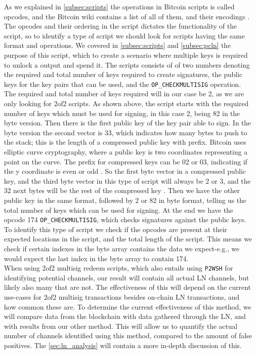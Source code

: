 As we explained in \cref{subsec:scripts} the operations in Bitcoin scripts is called opcodes, and the Bitcoin wiki contains a list of all of them, and their encodings \cite{bitcoin_wiki_scripts}. The opcodes and their ordering in the script dictates the functionality of the script, so to identify a type of script we should look for scripts having the same format and operations.
We covered in \cref{subsec:scripts} and \cref{subsec:pcln} the purpose of this script, which to create a scenario where multiple keys is required to unlock a output and spend it.
The scripts consists of of two numbers denoting the required and total number of keys required to create signatures, the public keys for the key pairs that can be used, and the {\tt OP\_CHECKMULTISIG} operation. The required and total number of keys required will in our case be 2, as we are only looking for 2of2 scripts.
As shown above, the script starts with the required number of keys which must be used for signing, in this case 2, being 82 in the byte version. Then there is the first public key of the key pair able to sign. 
In the byte version the second vector is 33, which indicates how many bytes to push to the stack; this is the length of a compressed public key with prefix. Bitcoin uses elliptic curve cryptography, where a public key is two coordinates representing a point on the curve. The prefix for compressed keys can be 02 or 03, indicating if the y coordinate is even or odd \cite{antonopoulos2017mastering}. So the first byte vector in a compressed public key, and the third byte vector in this type of script will always be 2 or 3, and the 32 next bytes will be the rest of the compressed key {\tt <public key 1>}. Then we have the other public key {\tt <public key 2>} in the same format, followed by 2 or 82 in byte format, telling us the total number of keys which can be used for signing. At the end we have the opcode 174 {\tt OP\_CHECKMULTISIG}, which checks signatures against the public keys. To identify this type of script we check if the opcodes are present at their expected locations in the script, and the total length of the script. This means we check if certain indexes in the byte array contains the data we expect-e.g., we would expect the last index in the byte array to contain 174.
\\

When using 2of2 multisig redeem scripts, which also entails using {\tt P2WSH} for identifying potential channels, our result will contain all actual LN channels, but likely also many that are not. The effectiveness of this will depend on the current use-cases for 2of2 multisig transactions besides on-chain LN transactions, and how common these are. To determine the current effectiveness of this method, we will compare data from the blockchain with data gathered through the LN, and with results from our other method. This will allow us to quantify the actual number of channels identified using this method, compared to the amount of false positives.
The \cref{sec:ln_analysis} will contain a more in-depth discussion of this.

